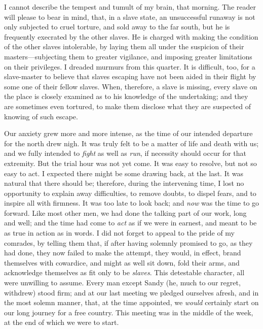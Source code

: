 {\protect\hypertarget{288}{}{}}I cannot describe the tempest and tumult
of my brain, that morning. The reader will please to bear in mind, that,
in a slave state, an unsuccessful runaway is not only subjected to cruel
torture, and sold away to the far south, but he is frequently execrated
by the other slaves. He is charged with making the condition of the
other slaves intolerable, by laying them all under the suspicion of
their masters---subjecting them to greater vigilance, and imposing
greater limitations on their privileges. I dreaded murmurs from this
quarter. It is difficult, too, for a slave-master to believe that slaves
escaping have not been aided in their flight by some one of their fellow
slaves. When, therefore, a slave is missing, every slave on the place is
closely examined as to his knowledge of the undertaking; and they are
sometimes even tortured, to make them disclose what they are suspected
of knowing of such escape.

Our anxiety grew more and more intense, as the time of our intended
departure for the north drew nigh. It was truly felt to be a matter of
life and death with us; and we fully intended to \emph{fight} as well as
\emph{run}, if necessity should occur for that extremity. But the trial
hour was not yet come. It was easy to resolve, but not so easy to act. I
expected there might be some drawing back, at the last. It was natural
that there should be; therefore, during the intervening time, I lost no
opportunity to explain away difficulties, to remove doubts, to dispel
fears, and to inspire all with firmness. It was too late to look back;
and \emph{now} was the time to go forward. Like most other men, we had
done the talking part {\protect\hypertarget{289}{}{}}of our work, long
and well; and the time had come to \emph{act} as if we were in earnest,
and meant to be as true in action as in words. I did not forget to
appeal to the pride of my comrades, by telling them that, if after
having solemnly promised to go, as they had done, they now failed to
make the attempt, they would, in effect, brand themselves with
cowardice, and might as well sit down, fold their arms, and acknowledge
themselves as fit only to be \emph{slaves}. This detestable character,
all were unwilling to assume. Every man except Sandy (he, much to our
regret, withdrew) stood firm; and at our last meeting we pledged
ourselves afresh, and in the most solemn manner, that, at the time
appointed, we \emph{would} certainly start on our long journey for a
free country. This meeting was in the middle of the week, at the end of
which we were to start.

